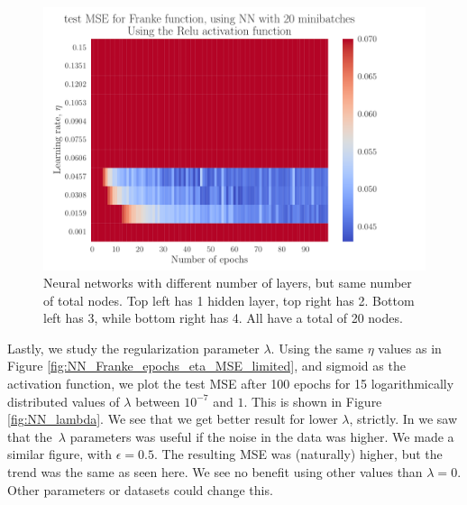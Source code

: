 \documentclass[12pt]{extarticle}
\begin{document}
\begin{figure}[h]
	\endminipage\hfill
	\includegraphics[width=\linewidth]{../output/plots/NN_Franke__epochs_eta__test_MSE__relu__704482.pdf}
	\endminipage
	\caption{Neural networks with different number of layers, but same number of total nodes. Top left has 1 hidden layer, top right has 2. Bottom left has 3, while bottom right has 4. All have a total of 20 nodes.}\label{fig:NN_layers}
\end{figure}

Lastly, we study the regularization parameter $\lambda$. Using the same $\eta$ values as in Figure \ref{fig:NN_Franke_epochs_eta_MSE_limited}, and sigmoid as the activation function, we plot the test MSE after 100 epochs for 15 logarithmically distributed values of $\lambda$ between $10^{-7}$ and $1$. This is shown in Figure \ref{fig:NN_lambda}. We see that we get better result for lower $\lambda$, strictly. In \cite{project1} we saw that the $\lambda$ parameters was useful if the noise in the data was higher. We made a similar figure, with $\epsilon=0.5$. The resulting MSE was (naturally) higher, but the trend was the same as seen here. We see no benefit using other values than $\lambda=0$. Other parameters or datasets could change this.
\end{document}
